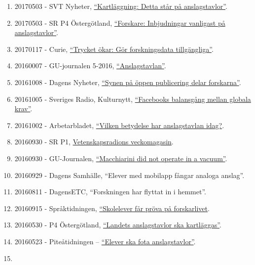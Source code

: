 \documentclass[
]{article}
\begin{document}
\begin{enumerate}
{  kartlägger porrbotarna på Twitter''}.
\item
  20170503 - SVT Nyheter,
  \href{https://www.svt.se/nyheter/lokalt/vast/elever-har-kartlagt-anslagstavlor-i-hela-landet}{``Kartläggning:
  Detta står på anslagstavlor''}.
\item
  20170503 - SR P4 Östergötland,
  \href{http://t.sr.se/2pdhEBb}{``Forskare: Inbjudningar vanligast på
  anslagstavlor''}.
\item
  20170117 - Curie,
  \href{http://www.tidningencurie.se/nyheter/2017/01/17/trycket-okar-gor-forskningsdata-tillgangliga/}{``Trycket
  ökar: Gör forskningsdata tillgängliga''}.
\item
  20160007 - GU-journalen 5-2016,
  \href{https://issuu.com/universityofgothenburg/docs/gu-journalen5-2016/34}{``Anslagstavlan''}.
\item
  20161008 - Dagens Nyheter,
  \href{http://www.dn.se/nyheter/sverige/synen-pa-oppen-publicering-delar-forskarna/}{``Synen
  på öppen publicering delar forskarna''}.
\item
  20161005 - Sveriges Radio, Kulturnytt,
  \href{http://sverigesradio.se/sida/artikel.aspx?programid=478\&artikel=6533649}{``Facebooks
  balansgång mellan globala krav''}.
\item
  20161002 - Arbetarbladet,
  \href{http://www.arbetarbladet.se/gavleborg/sandviken/vilken-betydelse-har-anslagstavlan-i-dag}{``Vilken
  betydelse har anslagstavlan idag?}.
\item
  20160930 - SR P1, \href{http://t.sr.se/2dszL0a}{Vetenskapsradions
  veckomagasin}.
\item
  20160930 - GU-Journalen,
  \href{https://issuu.com/universityofgothenburg/docs/guj4-2016}{``Macchiarini
  did not operate in a vacuum''}.
\item
  20160929 - Dagens Samhälle, ``Elever med mobilapp fångar analoga
  anslag''.
\item
  20160811 - DagensETC, ``Forskningen har flyttat in i hemmet''.
\item
  20160915 - Språktidningen,
  \href{http://spraktidningen.se/blogg/skolelever-far-prova-pa-forskarlivet}{``Skolelever
  får pröva på forskarlivet}.
\item
  20160530 - P4 Östergötland, \href{http://t.sr.se/1NY9nMZ}{``Landets
  anslagstavlor ska kartläggas''}.
\item
  20160523 - Piteåtidningen --
  \href{http://www.pt.se/nyheter/pitea/elever-ska-fota-anslagstavlor-10045575.aspx}{``Elever
  ska fota anslagstavlor''}.
\item

\end{enumerate}
\end{document}
